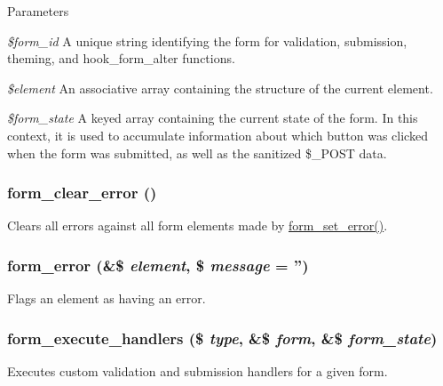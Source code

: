 \begin{DoxyParams}{Parameters}
\item[{\em \$form\_\-id}]A unique string identifying the form for validation, submission, theming, and hook\_\-form\_\-alter functions. \item[{\em \$element}]An associative array containing the structure of the current element. \item[{\em \$form\_\-state}]A keyed array containing the current state of the form. In this context, it is used to accumulate information about which button was clicked when the form was submitted, as well as the sanitized \$\_\-POST data. \end{DoxyParams}
\hypertarget{group__form__api_ga0e498e7fdd19cabd0b76efbea3e36bba}{
\subsubsection[{form\_\-clear\_\-error}]{\setlength{\rightskip}{0pt plus 5cm}form\_\-clear\_\-error ()}}
\label{group__form__api_ga0e498e7fdd19cabd0b76efbea3e36bba}
Clears all errors against all form elements made by \hyperlink{group__form__api_ga6f4ecbec42e905390e521b393417f97f}{form\_\-set\_\-error()}. \hypertarget{group__form__api_ga0e6b470194005ad3ff2fbf45f671dfa9}{
\subsubsection[{form\_\-error}]{\setlength{\rightskip}{0pt plus 5cm}form\_\-error (\&\$ {\em element}, \/  \$ {\em message} = {\ttfamily ''})}}
\label{group__form__api_ga0e6b470194005ad3ff2fbf45f671dfa9}
Flags an element as having an error. \hypertarget{group__form__api_ga9e32d49f4ca85da10a29dcfec27dd526}{
\subsubsection[{form\_\-execute\_\-handlers}]{\setlength{\rightskip}{0pt plus 5cm}form\_\-execute\_\-handlers (\$ {\em type}, \/  \&\$ {\em form}, \/  \&\$ {\em form\_\-state})}}
\label{group__form__api_ga9e32d49f4ca85da10a29dcfec27dd526}
Executes custom validation and submission handlers for a given form.

